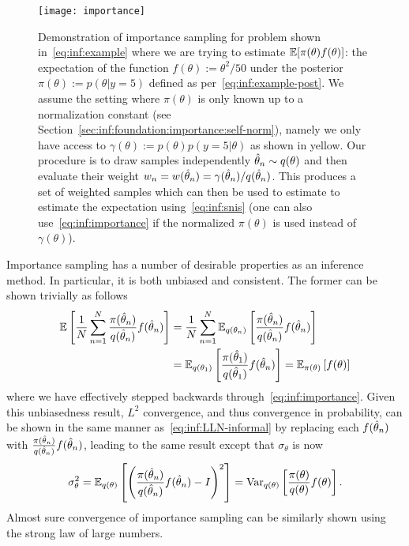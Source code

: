 \begin{figure}[t]
	\centering
	\texttt{[image: importance]}
	\caption{Demonstration of importance sampling for problem shown in~\eqref{eq:inf:example}
		where we are trying to estimate $\mathbb{E} [\pi(\theta)f(\theta)]$: the expectation of the function $f(\theta) := \theta^2/50$
		under the posterior $\pi(\theta):=p(\theta|y=5)$ defined as per~\eqref{eq:inf:example-post}.
		We assume the setting where $\pi(\theta)$ is only known up to a normalization constant
		(see Section~\ref{sec:inf:foundation:importance:self-norm}), namely we only have access
		to $\gamma(\theta) := p(\theta)p(y=5 | \theta)$ as shown in yellow.  Our procedure is to draw
		samples independently $\hat{\theta}_n \sim q(\theta)$ and then evaluate their weight 
		$w_n = w(\hat{\theta}_n) = \gamma(\hat{\theta}_n)/q(\hat{\theta}_n)$.  This produces a set of weighted samples
		which can then be used to estimate to estimate the expectation using~\eqref{eq:inf:snis}
		(one can also use~\eqref{eq:inf:importance} if the normalized $\pi(\theta)$ is used instead of
		$\gamma(\theta)$).
		\label{fig:inf:importance}}
\end{figure}

Importance sampling has a number of desirable properties as an inference method.
In particular, it is both unbiased and consistent.  The former can be shown trivially
as follows
\begin{align}
\mathbb{E} \left[\frac{1}{N} \sum_{n=1}^{N} \frac{\pi(\hat{\theta}_n)}{q(\hat{\theta}_n)} f(\hat{\theta}_n)\right] &=
\frac{1}{N} \sum_{n=1}^{N} \mathbb{E} _{q(\theta_n)}\left[\frac{\pi(\hat{\theta}_n)}{q(\hat{\theta}_n)} f(\hat{\theta}_n)\right] \nonumber \\
&=\mathbb{E} _{q(\theta_1)}\left[\frac{\pi(\hat{\theta}_1)}{q(\hat{\theta}_1)} f(\hat{\theta}_n)\right] =
\mathbb{E} _{\pi(\theta)}\left[f(\theta)\right]
\end{align}
where we have effectively stepped backwards through~\eqref{eq:inf:importance}.
Given this unbiasedness result, $L^2$ convergence, and thus convergence in probability,
can be shown in the same manner as~\eqref{eq:inf:LLN-informal} by replacing
each $f(\hat{\theta}_n)$ with $\frac{\pi(\hat{\theta}_n)}{q(\hat{\theta}_n)} f(\hat{\theta}_n)$, leading to the
same result except that $\sigma_{\theta}$ is now
\begin{align}
\label{eq:inf:sigma-imp}
\sigma_{\theta}^2 = \mathbb{E}_{q(\theta)} \left[\left(\frac{\pi(\hat{\theta}_n)}{q(\hat{\theta}_n)} f(\hat{\theta}_n)-I\right)^2\right]
= \mathrm{Var}_{q(\theta)} \left[\frac{\pi(\theta)}{q(\theta)} f(\theta)\right].
\end{align}
Almost sure convergence of importance sampling can be similarly shown using
the strong law of large numbers.

